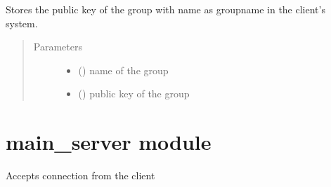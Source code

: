 \documentclass[letterpaper,10pt,english]{sphinxmanual}
\begin{document}

\begin{fulllineitems}
\label{\detokenize{grpencrypt:grpencrypt.public_key_storing}}
Stores the public key of the group with name as groupname in the client’s system.
\begin{quote}\begin{description}
\item[{Parameters}] \leavevmode\begin{itemize}
\item {} 
 () \textendash{} name of the group

\item {} 
 () \textendash{} public key of the group

\end{itemize}

\end{description}\end{quote}

\end{fulllineitems}



\section{main\_server module}
\label{\detokenize{main_server:module-main_server}}\label{\detokenize{main_server:main-server-module}}\label{\detokenize{main_server::doc}}

\begin{fulllineitems}
\label{\detokenize{main_server:main_server.acceptClient}}
Accepts connection from the client

\end{fulllineitems}

\end{document}
